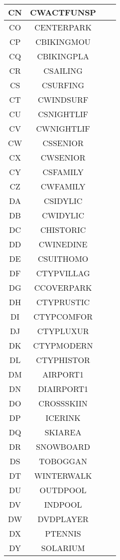 \begin{longtable}{ | c | c | c | c |}
	CN & CWACTFUNSP &  \\ \hline 
	CO & CENTERPARK &  \\ \hline 
	CP & CBIKINGMOU &  \\ \hline 
	CQ & CBIKINGPLA &  \\ \hline 
	CR & CSAILING &  \\ \hline 
	CS & CSURFING &  \\ \hline 
	CT & CWINDSURF &  \\ \hline 
	CU & CSNIGHTLIF &  \\ \hline 
	CV & CWNIGHTLIF &  \\ \hline 
	CW & CSSENIOR &  \\ \hline 
	CX & CWSENIOR &  \\ \hline 
	CY & CSFAMILY &  \\ \hline 
	CZ & CWFAMILY&  \\ \hline 
	DA & CSIDYLIC &  \\ \hline 
	DB & CWIDYLIC&  \\ \hline 
	DC & CHISTORIC &  \\ \hline 
	DD & CWINEDINE &  \\ \hline 
	DE & CSUITHOMO &  \\ \hline 
	DF & CTYPVILLAG &  \\ \hline 
	DG & CCOVERPARK &  \\ \hline 
	DH & CTYPRUSTIC &  \\ \hline 
	DI & CTYPCOMFOR &  \\ \hline 
	DJ & CTYPLUXUR &  \\ \hline 
	DK & CTYPMODERN &  \\ \hline 
	DL & CTYPHISTOR &  \\ \hline 
	DM & AIRPORT1 &  \\ \hline 
	DN & DIAIRPORT1 &  \\ \hline 
	DO & CROSSSKIIN &  \\ \hline 
	DP & ICERINK &  \\ \hline 
	DQ & SKIAREA &  \\ \hline 
	DR & SNOWBOARD &  \\ \hline 
	DS & TOBOGGAN &  \\ \hline 
	DT & WINTERWALK &  \\ \hline 
	DU & OUTDPOOL &  \\ \hline 
	DV & INDPOOL &  \\ \hline 
	DW & DVDPLAYER &  \\ \hline 
	DX & PTENNIS &  \\ \hline 
	DY & SOLARIUM &  \\ \hline 

\end{longtable}
